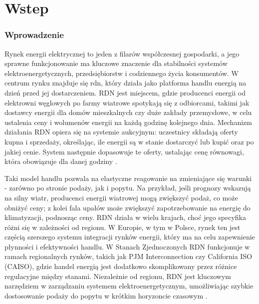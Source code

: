 \chapter{Wstep}

\subsection*{Wprowadzenie}
\label{ch:wprowadzenie}
Rynek energii elektrycznej to jeden z filarów współczesnej gospodarki, a jego sprawne funkcjonowanie ma kluczowe znaczenie dla stabilności systemów elektroenergetycznych, przedsiębiorstw i codziennego życia konsumentów. W centrum rynku znajduje się \gls{rdn}, który działa jako platforma handlu energią na dzień przed jej dostarczeniem. RDN jest miejscem, gdzie producenci energii od elektrowni węglowych po farmy wiatrowe spotykają się z odbiorcami, takimi jak dostawcy energii dla domów mieszkalnych czy duże zakłady przemysłowe, w celu ustalenia ceny i wolumenów energii na każdą godzinę kolejnego dnia. Mechanizm działania RDN opiera się na systemie aukcyjnym: uczestnicy składają oferty kupna i sprzedaży, określając, ile energii są w stanie dostarczyć lub kupić oraz po jakiej cenie. System następnie dopasowuje te oferty, ustalając cenę równowagi, która obowiązuje dla danej godziny \cite{maciejowska2022forecastingelectricityprices}.

Taki model handlu pozwala na elastyczne reagowanie na zmieniające się warunki - zarówno po stronie podaży, jak i popytu. Na przykład, jeśli prognozy wskazują na silny wiatr, producenci energii wiatrowej mogą zwiększyć podaż, co może obniżyć ceny; z kolei fala upałów może zwiększyć zapotrzebowanie na energię do klimatyzacji, podnosząc ceny. RDN działa w wielu krajach, choć jego specyfika różni się w zależności od regionu. W Europie, w tym w Polsce, rynek ten jest częścią szerszego systemu integracji rynków energii, który ma na celu zapewnienie płynności i efektywności handlu. W Stanach Zjednoczonych RDN funkcjonuje w ramach regionalnych rynków, takich jak PJM Interconnection czy California ISO (CAISO), gdzie handel energią jest dodatkowo skomplikowany przez różnice regulacyjne między stanami. Niezależnie od regionu, RDN jest kluczowym narzędziem w zarządzaniu systemem elektroenergetycznym, umożliwiając szybkie dostosowanie podaży do popytu w krótkim horyzoncie czasowym \cite{maciejowska2022forecastingelectricityprices}.

